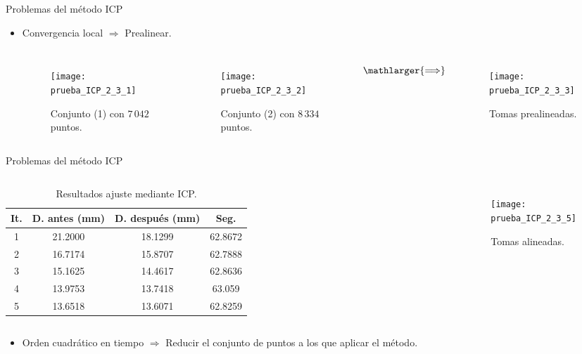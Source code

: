 \documentclass[9pt]{beamer}
\begin{document}
	\begin{frame}{Problemas del método ICP}
		\begin{itemize}
			\item Convergencia local $ \Longrightarrow $ Prealinear.
			\begin{columns}
				\begin{figure}[h!]
					\texttt{[image: prueba\_ICP\_2\_3\_1]} 
					\caption{Conjunto (1) con $ 7\,042 $ puntos.}
				\end{figure}
				\begin{figure}[h!]
					\texttt{[image: prueba\_ICP\_2\_3\_2]}
					\caption{Conjunto (2) con $ 8\,334 $ puntos.}
				\end{figure} 
				\[
				\mathlarger{\Longrightarrow}
				\]
				\begin{figure}[h!]
					\texttt{[image: prueba\_ICP\_2\_3\_3]}
					\caption{Tomas prealineadas.}
				\end{figure} 
			\end{columns}
		
		\end{itemize}
	
	\end{frame}

	\begin{frame}{Problemas del método ICP}
		\begin{columns}
			\column{0.5\textwidth}
			\begin{table}[h!]
				\centering
				\begin{tabular}{| c | c | c | c |} 
					\hline
					It. & D. antes (mm)  & D. después (mm) & Seg. \\
					\hline
					1 & 21.2000 & 18.1299 & 62.8672\\		 
					2 & 16.7174 &  15.8707 &  62.7888\\	
					3 & 15.1625 & 14.4617  & 62.8636\\
					4 & 13.9753 &  13.7418 & 63.059\\
					5 &  13.6518 &  13.6071 & 62.8259\\
					\hline
				\end{tabular}
				\caption{Resultados ajuste mediante ICP.}
			\end{table}
			\column{0.5\textwidth}
			\begin{figure}[h!]
				\texttt{[image: prueba\_ICP\_2\_3\_5]}
				\caption{Tomas alineadas.}
			\end{figure} 
		\end{columns}
		
		\begin{itemize}
			\item Orden cuadrático en tiempo $ \Longrightarrow $ Reducir el conjunto de puntos a los que aplicar el método.
		\end{itemize}
	\end{frame}
\end{document}
